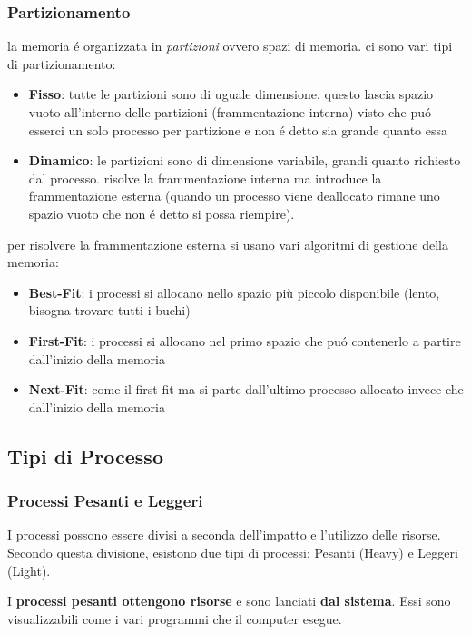 \documentclass{article}
\begin{document}
{  \subsubsection{Partizionamento} %
  la memoria é organizzata in \textit{partizioni} ovvero spazi di memoria. ci sono vari tipi di partizionamento:
  \begin{itemize}
    \item \textbf{Fisso}: tutte le partizioni sono di uguale dimensione. questo lascia spazio vuoto all'interno delle partizioni (frammentazione interna) visto che puó esserci un solo processo per partizione e non é detto sia grande quanto essa 
    \item \textbf{Dinamico}: le partizioni sono di dimensione variabile, grandi quanto richiesto dal processo. risolve la frammentazione interna ma introduce la frammentazione esterna (quando un processo viene deallocato rimane uno spazio vuoto che non é detto si possa riempire).
  \end{itemize}
  
  per risolvere la frammentazione esterna si usano vari algoritmi di gestione della memoria:
  \begin{itemize}
    \item \textbf{Best-Fit}: i processi si allocano nello spazio più piccolo disponibile (lento, bisogna trovare tutti i buchi)
    \item \textbf{First-Fit}: i processi si allocano nel primo spazio che puó contenerlo a partire dall'inizio della memoria
    \item \textbf{Next-Fit}: come il first fit ma si parte dall'ultimo processo allocato invece che dall'inizio della memoria
  \end{itemize}

  \subsection{Tipi di Processo}
  \subsubsection{Processi Pesanti e Leggeri} %
  I processi possono essere divisi a seconda dell'impatto e l'utilizzo delle risorse. Secondo questa divisione, esistono due tipi di processi: Pesanti (Heavy) e Leggeri (Light).

  I \textbf{processi pesanti ottengono risorse} e sono lanciati \textbf{dal sistema}. Essi sono visualizzabili come i vari programmi che il computer esegue.

}
\end{document}
